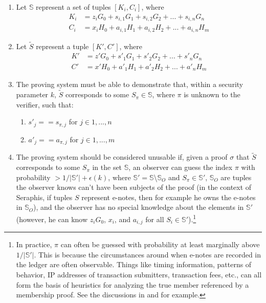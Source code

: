 \begin{enumerate}
    \item Let $\mathbb{S}$ represent a set of tuples $[K_i, C_i]$, where\vspace{.115cm}
    \begin{align*}
        K_i &= z_i G_0 + s_{i,1} G_1 + s_{i,2} G_2 + ... + s_{i,n} G_n \\
        C_i &= x_i H_0 + a_{i,1} H_1 + a_{i,2} H_2 + ... + a_{i,n} H_m
    \end{align*}

    \item Let $\tilde{S}$ represent a tuple $[K', C']$, where\vspace{.115cm}
    \begin{align*}
        K' &= z' G_0 + s'_1 G_1 + s'_2 G_2 + ... + s'_n G_n \\
        C' &= x' H_0 + a'_1 H_1 + a'_2 H_2 + ... + a'_n H_m
    \end{align*}

    \item The proving system must be able to demonstrate that, within a security parameter $k$, $\tilde{S}$ corresponds to some $S_{\pi} \in \mathbb{S}$, where $\pi$ is unknown to the verifier, such that:
    \begin{enumerate}
        \item $s'_j == s_{\pi,j}$ for $j \in 1,...,n$
        \item $a'_j == a_{\pi,j}$ for $j \in 1,...,m$
    \end{enumerate}

    \item The proving system should be considered unusable if, given a proof $\sigma$ that $\tilde{S}$ corresponds to some $S_{\pi}$ in the set $\mathbb{S}$, an observer can guess the index $\pi$ with probability $> 1/|\mathbb{S}'| + \epsilon(k)$, where $\mathbb{S}' = \mathbb{S}$\textbackslash$\mathbb{S}_O$ and $S_{\pi} \in \mathbb{S}'$, $\mathbb{S}_O$ are tuples the observer knows can't have been subjects of the proof (in the context of Seraphis, if tuples $S$ represent e-notes, then for example he owns the e-notes in $\mathbb{S}_O$), and the observer has no special knowledge about the elements in $\mathbb{S}'$ (however, he can know $z_i G_0$, $x_i$, and $a_{i,j}$ for all $S_i \in \mathbb{S}'$).\footnote{In practice, $\pi$ can often be guessed with probability at least marginally above $1/|\mathbb{S}'|$. This is because the circumstances around when e-notes are recorded in the ledger are often observable. Things like timing information, patterns of behavior, IP addresses of transaction submitters, transaction fees, etc., can all form the basis of heuristics for analyzing the true member referenced by a membership proof. See the discussions in \cite{AnalysisOfLinkability} and \cite{foundations-ring-sampling} for example.}
\end{enumerate}

